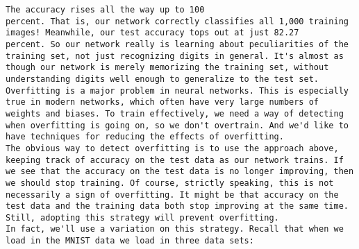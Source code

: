 \begin{lstlisting}
The accuracy rises all the way up to 100
percent. That is, our network correctly classifies all 1,000 training images! Meanwhile, our test accuracy tops out at just 82.27
percent. So our network really is learning about peculiarities of the training set, not just recognizing digits in general. It's almost as though our network is merely memorizing the training set, without understanding digits well enough to generalize to the test set.
Overfitting is a major problem in neural networks. This is especially true in modern networks, which often have very large numbers of weights and biases. To train effectively, we need a way of detecting when overfitting is going on, so we don't overtrain. And we'd like to have techniques for reducing the effects of overfitting.
The obvious way to detect overfitting is to use the approach above, keeping track of accuracy on the test data as our network trains. If we see that the accuracy on the test data is no longer improving, then we should stop training. Of course, strictly speaking, this is not necessarily a sign of overfitting. It might be that accuracy on the test data and the training data both stop improving at the same time. Still, adopting this strategy will prevent overfitting.
In fact, we'll use a variation on this strategy. Recall that when we load in the MNIST data we load in three data sets: 
 

\end{lstlisting}
